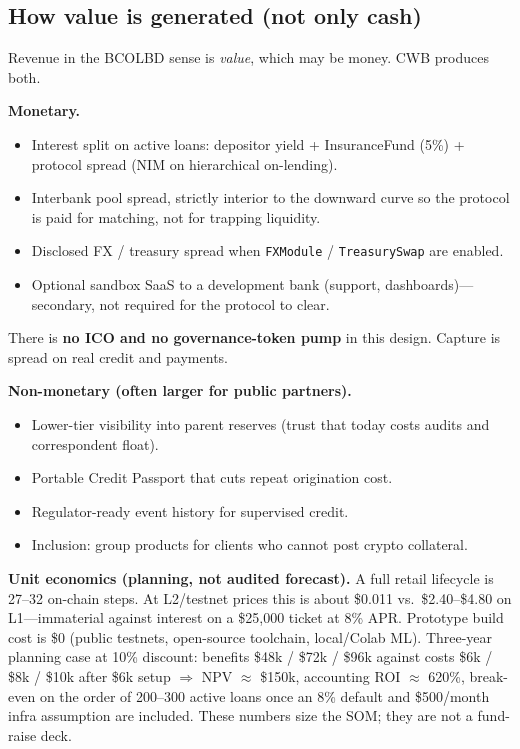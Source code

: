 \documentclass[11pt,a4paper]{article}
\begin{document}
\subsection{How value is generated (not only cash)}

Revenue in the BCOLBD sense is \textit{value}, which may be money. CWB produces both.

\textbf{Monetary.}
\begin{itemize}
  \item Interest split on active loans: depositor yield + InsuranceFund (5\%) + protocol spread (NIM on hierarchical on-lending).
  \item Interbank pool spread, strictly interior to the downward curve so the protocol is paid for matching, not for trapping liquidity.
  \item Disclosed FX / treasury spread when \texttt{FXModule} / \texttt{TreasurySwap} are enabled.
  \item Optional sandbox SaaS to a development bank (support, dashboards)---secondary, not required for the protocol to clear.
\end{itemize}
There is \textbf{no ICO and no governance-token pump} in this design. Capture is spread on real credit and payments.

\textbf{Non-monetary (often larger for public partners).}
\begin{itemize}
  \item Lower-tier visibility into parent reserves (trust that today costs audits and correspondent float).
  \item Portable Credit Passport that cuts repeat origination cost.
  \item Regulator-ready event history for supervised credit.
  \item Inclusion: group products for clients who cannot post crypto collateral.
\end{itemize}

\textbf{Unit economics (planning, not audited forecast).} A full retail lifecycle is 27--32 on-chain steps. At L2/testnet prices this is about \$0.011 vs.\ \$2.40--\$4.80 on L1---immaterial against interest on a \$25{,}000 ticket at 8\% APR. Prototype build cost is \$0 (public testnets, open-source toolchain, local/Colab ML). Three-year planning case at 10\% discount: benefits \$48k / \$72k / \$96k against costs \$6k / \$8k / \$10k after \$6k setup $\Rightarrow$ NPV $\approx$ \$150k, accounting ROI $\approx$ 620\%, break-even on the order of 200--300 active loans once an 8\% default and \$500/month infra assumption are included. These numbers size the SOM; they are not a fund-raise deck.
\end{document}
